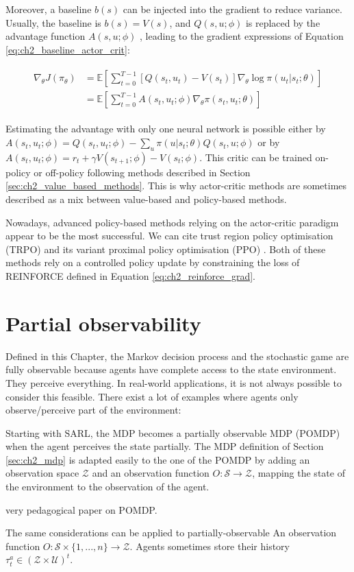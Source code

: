 Moreover, a baseline $b(s)$ can be injected into the gradient to reduce variance.
Usually, the baseline is  $b(s) = V(s)$, and $Q(s, u;\phi)$ is replaced by the advantage function $A(s,u; \phi)$ \citep{10.5555/2074022.2074088}, leading to the gradient expressions of Equation \ref{eq:ch2_baseline_actor_crit}:

\begin{align}
\begin{split}
\label{eq:ch2_baseline_actor_crit}
    \nabla_\theta J(\pi_\theta)
    & = \mathbb{E}\left[\sum_{t=0}^{T-1} [Q(s_t, u_t) - V(s_t)] \nabla_\theta \log \pi(u_t|s_t;\theta)\right]\\
    & = \mathbb{E} \left[\sum_{t=0}^{T-1} A(s_t, u_t; \phi) \nabla_\theta \pi(s_t, u_t; \theta)\right]
\end{split}
\end{align}

Estimating the advantage with only one neural network is possible either by $A(s_t,u_t; \phi)=Q(s_t, u_t;\phi)-\sum_u \pi(u|s_t;\theta) Q(s_t,u; \phi)$ or by $A(s_t,u_t; \phi)=r_t +\gamma V(s_{t+1};\phi) - V(s_t;\phi)$.
This critic can be trained on-policy or off-policy following methods described in Section \ref{sec:ch2_value_based_methods}.
This is why actor-critic methods are sometimes described as a mix between value-based and policy-based methods.

Nowadays, advanced policy-based methods relying on the actor-critic paradigm appear to be the most successful.
We can cite trust region policy optimisation (TRPO) \citep{schulman2015trust} and its variant proximal policy optimisation (PPO) \citep{schulman2017ppo}.
Both of these methods rely on a controlled policy update by constraining the loss of REINFORCE defined in Equation \ref{eq:ch2_reinforce_grad}.

\section{Partial observability} \label{sec:ch2_partial_observability}
Defined in this Chapter, the Markov decision process and the stochastic game are fully observable because agents have complete access to the state environment.
They perceive everything.
In real-world applications, it is not always possible to consider this feasible.
There exist a lot of examples where agents only observe/perceive part of the environment:

Starting with SARL, the MDP becomes a partially observable MDP (POMDP) when the agent perceives the state partially.
The MDP definition of Section \ref{sec:ch2_mdp} is adapted easily to the one of the POMDP by adding an observation space $\mathcal{Z}$ and an observation function $O:\mathcal{S} \rightarrow \mathcal{Z}$, mapping the state of the environment to the observation of the agent.


very pedagogical paper on POMDP.

The same considerations can be applied to partially-observable 
An observation function $O:\mathcal{S} \times \{1,...,n\} \rightarrow \mathcal{Z}$.
Agents sometimes store their history $\tau^a_t \in (\mathcal{Z} \times \mathcal{U})^t$.

